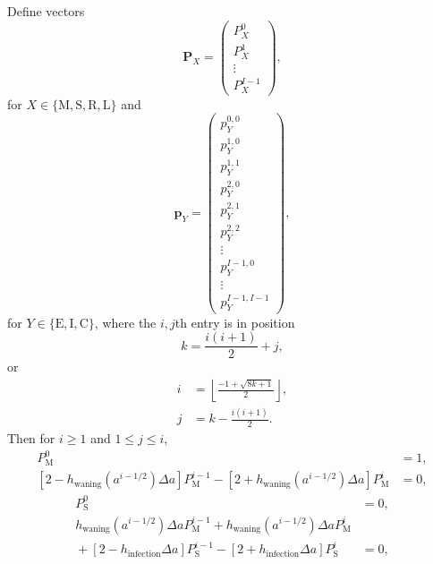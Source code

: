 \documentclass[12pt]{article}
\renewcommand{\vec}[1]{\mathbf{#1}}
\begin{document}
Define vectors
\begin{equation}
  \vec{P}_X =
  \begin{pmatrix}
    P_X^0\\
    P_X^1\\
    \vdots\\
    P_X^{I - 1}
  \end{pmatrix},
\end{equation}
for $X \in \{\mathrm{M}, \mathrm{S}, \mathrm{R}, \mathrm{L}\}$ and
\begin{equation}
  \vec{p}_Y =
  \begin{pmatrix}
    p_Y^{0, 0}\\
    p_Y^{1, 0}\\
    p_Y^{1, 1}\\
    p_Y^{2, 0}\\
    p_Y^{2, 1}\\
    p_Y^{2, 2}\\
    \vdots\\
    p_Y^{I - 1, 0}\\
    \vdots\\
    p_Y^{I - 1, I - 1}
  \end{pmatrix},
\end{equation}
for $Y \in \{\mathrm{E}, \mathrm{I}, \mathrm{C}\}$,
where the $i, j$th entry is in position
\begin{equation}
  k = \frac{i (i + 1)}{2} + j,
\end{equation}
or
\begin{equation}
  \begin{split}
    i &= \left\lfloor\frac{- 1 + \sqrt{8 k + 1}}{2}\right\rfloor,
    \\
    j &= k - \frac{i (i + 1)}{2}.
  \end{split}
\end{equation}
Then for $i \geq 1$ and $1 \leq j \leq i$,
\begin{equation}
  \begin{split}
    P_{\mathrm{M}}^0 &= 1,
    \\
    \left[2 - h_{\text{waning}}(a^{i - 1 / 2}) \Delta a\right]
    P_{\mathrm{M}}^{i - 1}
    - \left[2 + h_{\text{waning}}(a^{i - 1 / 2}) \Delta a\right]
    P_{\mathrm{M}}^i
    &= 0,
  \end{split}
\end{equation}
\begin{equation}
  \begin{split}
    P_{\mathrm{S}}^0 &= 0,
    \\
    h_{\text{waning}}(a^{i - 1 / 2}) \Delta a P_{\mathrm{M}}^{i - 1}
    + h_{\text{waning}}(a^{i - 1 / 2}) \Delta a P_{\mathrm{M}}^i
    \\ {}
    + \left[2 - h_{\text{infection}} \Delta a\right]
    P_{\mathrm{S}}^{i - 1}
    - \left[2 + h_{\text{infection}} \Delta a\right]
    P_{\mathrm{S}}^i
    &= 0,
  \end{split}
\end{equation}
\end{document}

